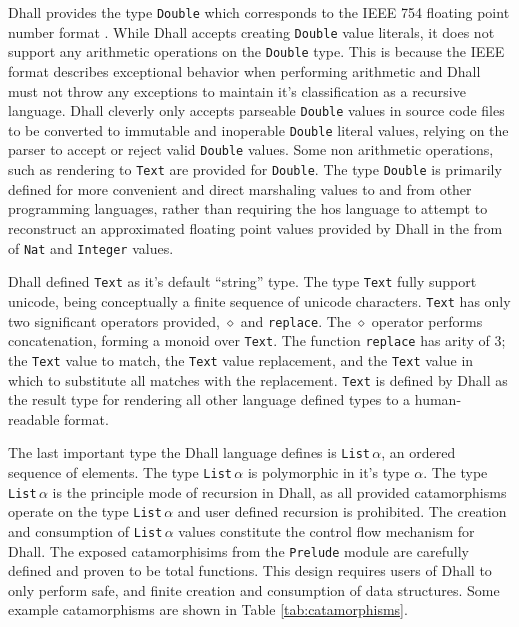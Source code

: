 \documentclass[12pt]{diazessay}
\newcommand{\Nat    }{\texttt{Nat}}
\newcommand{\Integer}{\texttt{Integer}}
\newcommand{\Double }{\texttt{Double}}
\begin{document}
Dhall provides the type \Double{} which corresponds to the IEEE 754 floating point number format \cite{30711}.
While Dhall accepts creating \Double{} value literals, it does not support any arithmetic operations on the \Double{} type.
This is because the IEEE format describes exceptional behavior when performing arithmetic and Dhall must not throw any exceptions to maintain it's classification as a recursive language.
Dhall cleverly only accepts parseable \Double{} values in source code files to be converted to immutable and inoperable \Double{} literal values, relying on the parser to accept or reject valid \Double{} values.
Some non arithmetic operations, such as rendering to \texttt{Text} are provided for \Double{}.
The type \Double{} is primarily defined for more convenient and direct marshaling values to and from other programming languages, rather than requiring the hos language to attempt to reconstruct an approximated floating point values provided by Dhall in the from of \Nat{} and \Integer{} values.

Dhall defined \texttt{Text} as it's default ``string'' type.
The type \texttt{Text} fully support unicode, being conceptually a finite sequence of unicode characters.
\texttt{Text} has only two significant operators provided, $\diamond$ and \texttt{replace}.
The $\diamond$ operator performs concatenation, forming a monoid \cite{cayley1863xxi} over \texttt{Text}.
The function \texttt{replace} has arity of $3$; the \texttt{Text} value to match, the \texttt{Text} value replacement, and the \texttt{Text} value in which to substitute all matches with the replacement.
\texttt{Text} is defined by Dhall as the result type for rendering all other language defined types to a human-readable format.

The last important type the Dhall language defines is \texttt{List$\,\alpha$}, an ordered sequence of elements.
The type \texttt{List$\,\alpha$} is polymorphic in it's type $\alpha$.
The type  \texttt{List$\,\alpha$} is the principle mode of recursion in Dhall, as all provided catamorphisms operate on the type \texttt{List$\,\alpha$} and user defined recursion is prohibited.
The creation and consumption of \texttt{List$\,\alpha$} values constitute the control flow mechanism for Dhall.
The exposed catamorphisims from the \texttt{Prelude} module are carefully defined and proven to be total functions.
This design requires users of Dhall to only perform safe, and finite creation and consumption of data structures.
Some example catamorphisms are shown in Table \ref{tab:catamorphisms}.
\end{document}
